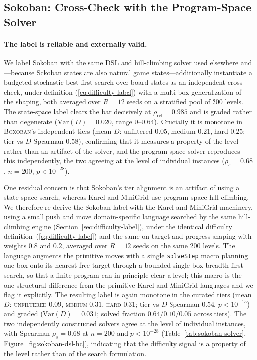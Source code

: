 \documentclass[twoside]{article}
\newcommand{\Var}{\mathrm{Var}}
\begin{document}
\subsection{Sokoban: Cross-Check with the Program-Space Solver}
\paragraph{The label is reliable and externally valid.} We label Sokoban with the same DSL and hill-climbing solver used elsewhere and---because Sokoban states are also natural game states---additionally instantiate a budgeted stochastic best-first search over board states as an independent cross-check, under definition (\ref{eq:difficulty-label}) with a multi-box generalization of the shaping, both averaged over $R=12$ seeds on a stratified pool of $200$ levels. The state-space label clears the bar decisively at $\rho_{\mathrm{rel}} = 0.985$ and is graded rather than degenerate ($\Var(D)=0.020$, range $0$--$0.64$). Crucially it is monotone in \textsc{Boxoban}'s independent tiers (mean $D$: unfiltered $0.05$, medium $0.21$, hard $0.25$; tier-vs-$D$ Spearman $0.58$), confirming that it measures a property of the level rather than an artifact of the solver, and the program-space solver reproduces this independently, the two agreeing at the level of individual instances ($\rho_s = 0.68$, $n=200$, $p<10^{-28}$).

One residual concern is that Sokoban's tier alignment is an artifact of using a state-space search, whereas Karel and MiniGrid use program-space hill climbing. We therefore re-derive the Sokoban label with the Karel and MiniGrid machinery, using a small push and move domain-specific language searched by the same hill-climbing engine (Section~\ref{sec:difficulty-label}), under the identical difficulty definition~(\ref{eq:difficulty-label}) and the same on-target and progress shaping with weights $0.8$ and $0.2$, averaged over $R=12$ seeds on the same $200$ levels. The language augments the primitive moves with a single \texttt{solveStep} macro planning one box onto its nearest free target through a bounded single-box breadth-first search, so that a finite program can in principle clear a level; this macro is the one structural difference from the primitive Karel and MiniGrid languages and we flag it explicitly. The resulting label is again monotone in the curated tiers (mean $D$: \textsc{unfiltered} $0.09$, \textsc{medium} $0.31$, \textsc{hard} $0.31$; tier-vs-$D$ Spearman $0.54$, $p<10^{-15}$) and graded ($\Var(D)=0.031$; solved fraction $0.64/0.10/0.05$ across tiers). The two independently constructed solvers agree at the level of individual instances, with Spearman $\rho_s = 0.68$ at $n=200$ and $p<10^{-28}$ (Table~\ref{tab:sokoban-solver}, Figure~\ref{fig:sokoban-dsl-hc}), indicating that the difficulty signal is a property of the level rather than of the search formulation.
\end{document}
